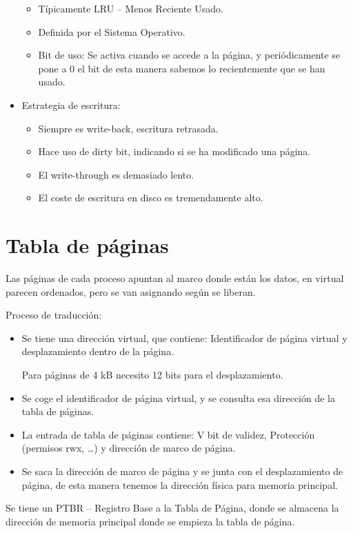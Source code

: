 \documentclass[12pt, twoside, openright]{report} %
\begin{document}
\begin{itemize}
	      \begin{itemize}

		      \item Típicamente LRU -- Menos Reciente Usado.
		      \item Definida por el Sistema Operativo.
		      \item Bit de uso: Se activa cuando se accede a la página, y
		            periódicamente se pone a 0 el bit de esta manera sabemos lo
		            recientemente que se han usado.
	      \end{itemize}
	\item Estrategia de escritura:

	      \begin{itemize}

		      \item Siempre es write-back, escritura retrasada.
		      \item Hace uso de dirty bit, indicando si se ha modificado una página.
		      \item El write-through es demasiado lento.
		      \item El coste de escritura en disco es tremendamente alto.
	      \end{itemize}
\end{itemize}

\section{Tabla de páginas}

Las páginas de cada proceso apuntan al marco donde están los datos, en
virtual parecen ordenados, pero se van asignando según se liberan.

Proceso de traducción:
\begin{itemize}

	\item Se tiene una dirección virtual, que contiene: Identificador de
	      página virtual y desplazamiento dentro de la página.

	      Para páginas de 4 kB necesito 12 bits para el desplazamiento.



	\item Se coge el identificador de página virtual, y se consulta esa
	      dirección de la tabla de páginas.
	\item La entrada de tabla de páginas contiene: V bit de validez,
	      Protección (permisos rwx, \ldots) y dirección de marco de página.
	\item Se saca la dirección de marco de página y se junta con el
	      desplazamiento de página, de esta manera tenemos la dirección física
	      para memoria principal.
	      \begin{figure}[H]
		      {\def\svgwidth{.9\textwidth}
			      }
	      \end{figure}
\end{itemize}
Se tiene un PTBR -- Registro Base a la Tabla de Página, donde se
almacena la dirección de memoria principal donde se empieza la tabla
de página.
\end{document}
